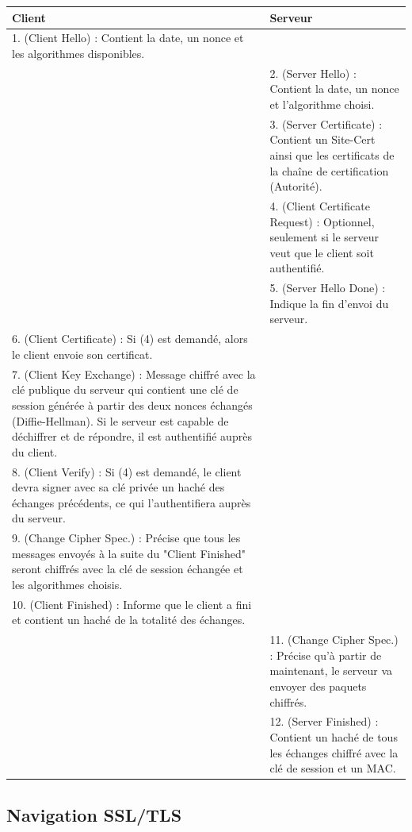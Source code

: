 \documentclass[a4paper,11pt,french]{article}
\begin{document}
\begin{tabular}{|m{8cm}|m{8cm}|}
   \hline
  \rowcolor[gray]{.8} Client & Serveur \\
   \hline
1. (Client Hello) : Contient la date, un nonce et les algorithmes disponibles. & \\
   \hline
&2. (Server Hello) : Contient la date, un nonce et l'algorithme choisi.\\
   \hline
& 3. (Server Certificate) :  Contient un Site-Cert ainsi que les certificats de la chaîne de certification (Autorité).\\
   \hline
& 4. (Client Certificate Request) : Optionnel, seulement si le serveur veut que le client soit authentifié.\\
   \hline
& 5. (Server Hello Done) : Indique la fin d'envoi du serveur.\\
   \hline
6. (Client Certificate) : Si (4) est demandé, alors le client envoie son certificat. & \\
   \hline
7. (Client Key Exchange) : Message chiffré avec la clé publique du serveur qui contient une clé de session générée à partir des deux nonces échangés (Diffie-Hellman). Si le serveur est capable de déchiffrer et de répondre, il est authentifié auprès du client. & \\
   \hline
8. (Client Verify) : Si (4) est demandé, le client devra signer avec sa clé privée un haché des échanges précédents, ce qui l'authentifiera auprès du serveur. & \\
   \hline
9. (Change Cipher Spec.) : Précise que tous les messages envoyés à la suite du "Client Finished" seront chiffrés avec la clé de session échangée et les algorithmes choisis. & \\
   \hline
10. (Client Finished) : Informe que le client a fini et contient un haché de la totalité des échanges. & \\
   \hline
& 11. (Change Cipher Spec.) : Précise qu'à partir de maintenant, le serveur va envoyer des paquets chiffrés. \\
   \hline
& 12. (Server Finished) : Contient un haché de tous les échanges chiffré avec la clé de session et un MAC.\\
   \hline
\end{tabular}

\subsection{Navigation SSL/TLS}
\end{document}
